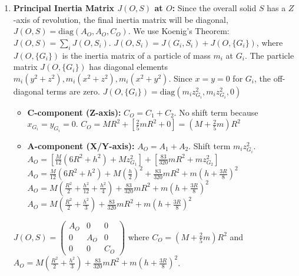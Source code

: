 \documentclass[12pt]{article}
\begin{document}
\begin{correctionbox}
\begin{enumerate}
    \item \textbf{Principal Inertia Matrix $J(O, S)$ at $O$:}
        Since the overall solid $S$ has a $Z$-axis of revolution, the final inertia matrix will be diagonal, $J(O, S) = \text{diag}(A_O, A_O, C_O)$.
        We use Koenig's Theorem: $J(O, S) = \sum_i J(O, S_i)$.
        $J(O, S_i) = J(G_i, S_i) + J(O, \{G_i\})$, where $J(O, \{G_i\})$ is the inertia matrix of a particle of mass $m_i$ at $G_i$.
        The particle matrix $J(O, \{G_i\})$ has diagonal elements $m_i (y^2+z^2), m_i (x^2+z^2), m_i (x^2+y^2)$. Since $x=y=0$ for $G_i$, the off-diagonal terms are zero.
        $J(O, \{G_i\}) = \text{diag}(m_i z_{G_i}^2, m_i z_{G_i}^2, 0)$
        \begin{itemize}
            \item \textbf{C-component (Z-axis):} $C_O = C_1 + C_2$. No shift term because $x_{G_i}=y_{G_i}=0$.
                $C_O = M R^2 + \left[\frac{2}{5} m R^2 + 0\right] = \left(M + \frac{2}{5} m\right) R^2$
            \item \textbf{A-component (X/Y-axis):} $A_O = A_1 + A_2$. Shift term $m_i z_{G_i}^2$.
                $A_O = \left[\frac{M}{12}(6R^2+h^2) + M z_{G_1}^2\right] + \left[\frac{83}{320} m R^2 + m z_{G_2}^2\right]$
                $A_O = \frac{M}{12}(6R^2+h^2) + M\left(\frac{h}{2}\right)^2 + \frac{83}{320} m R^2 + m\left(h+\frac{3R}{8}\right)^2$
                $A_O = M\left(\frac{R^2}{2} + \frac{h^2}{12} + \frac{h^2}{4}\right) + \frac{83}{320} m R^2 + m\left(h+\frac{3R}{8}\right)^2$
                $A_O = M\left(\frac{R^2}{2} + \frac{h^2}{3}\right) + \frac{83}{320} m R^2 + m\left(h+\frac{3R}{8}\right)^2$
        \end{itemize}
        $J(O, S) = \begin{pmatrix} A_O & 0 & 0 \\ 0 & A_O & 0 \\ 0 & 0 & C_O \end{pmatrix}$
        where $C_O = \left(M + \frac{2}{5} m\right) R^2$ and $A_O = M\left(\frac{R^2}{2} + \frac{h^2}{3}\right) + \frac{83}{320} m R^2 + m\left(h+\frac{3R}{8}\right)^2$.

\end{enumerate}

\end{correctionbox}
\end{document}
